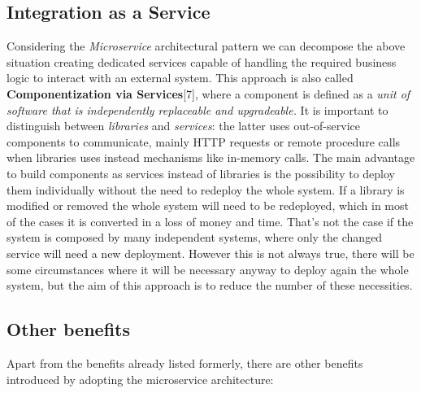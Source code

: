 \subsection{Integration as a Service}
Considering the \textit{Microservice} architectural pattern we can decompose
the above situation creating dedicated services capable of handling the
required business logic to interact with an external system. This approach
is also called \textbf{Componentization via Services}[7], where a component is defined
as a \textit{unit of software that is independently replaceable and upgradeable.}
It is important to distinguish between \textit{libraries} and \textit{services}:
the latter uses out-of-service components to communicate, mainly HTTP requests or
remote procedure calls when libraries uses instead mechanisms like in-memory calls.
The main advantage to build components as services instead of libraries is the
possibility to deploy them individually without the need to redeploy the whole system.
If a library is modified or removed the whole system will need to be redeployed,
which in most of the cases it is converted in a loss of money and time. That's not
the case if the system is composed by many independent systems, where only the changed
service will need a new deployment. However this is not always true, there will be some
circumstances where it will be necessary anyway to deploy again the whole system, but the
aim of this approach is to reduce the number of these necessities.

\subsection{Other benefits}
Apart from the benefits already listed formerly, there are other benefits introduced by
adopting the microservice architecture:

